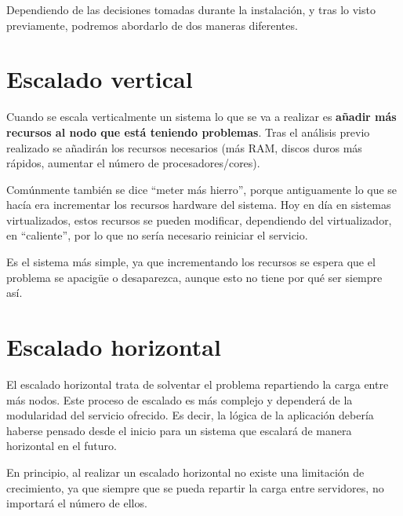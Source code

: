 Dependiendo de las decisiones tomadas durante la instalación, y tras lo visto previamente, podremos abordarlo de dos maneras diferentes.


\section{Escalado vertical}

Cuando se escala verticalmente un sistema lo que se va a realizar es \textbf{añadir más recursos al nodo que está teniendo problemas}. Tras el análisis previo realizado se añadirán los recursos necesarios (más RAM, discos duros más rápidos, aumentar el número de procesadores/cores).

Comúnmente también se dice “meter más hierro”, porque antiguamente lo que se hacía era incrementar los recursos hardware del sistema. Hoy en día en sistemas virtualizados, estos recursos se pueden modificar, dependiendo del virtualizador, en “caliente”, por lo que no sería necesario reiniciar el servicio.

Es el sistema más simple, ya que incrementando los recursos se espera que el problema se apacigüe o desaparezca, aunque esto no tiene por qué ser siempre así.

\section{Escalado horizontal}

El escalado horizontal trata de solventar el problema repartiendo la carga entre más nodos. Este proceso de escalado es más complejo y dependerá de la modularidad del servicio ofrecido. Es decir, la lógica de la aplicación debería haberse pensado desde el inicio para un sistema que escalará de manera horizontal en el futuro.

En principio, al realizar un escalado horizontal no existe una limitación de crecimiento, ya que siempre que se pueda repartir la carga entre servidores, no importará el número de ellos.


